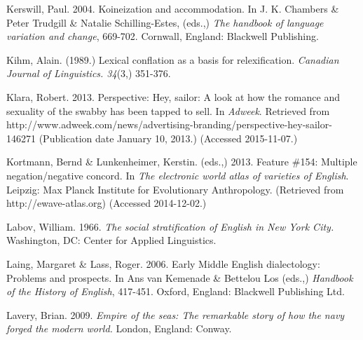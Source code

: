 \begin{styleStandard}
Kerswill, Paul. 2004. Koineization and accommodation. In J. K. Chambers \& Peter Trudgill \& Natalie Schilling-Estes, (eds.,) \textit{The handbook of language variation and change}, 669-702. Cornwall, England: Blackwell Publishing.
\end{styleStandard}


\begin{styleStandard}
Kihm, Alain. (1989.) Lexical conflation as a basis for relexification. \textit{Canadian Journal of Linguistics. 34}(3,) 351-376.
\end{styleStandard}


\begin{styleStandard}
Klara, Robert. 2013. Perspective: Hey, sailor: A look at how the romance and sexuality of the swabby has been tapped to sell. In \textit{Adweek}. Retrieved from http://www.adweek.com/news/advertising-branding/perspective-hey-sailor-146271 (Publication date January 10, 2013.) (Accessed 2015-11-07.)
\end{styleStandard}


\begin{styleStandard}
Kortmann, Bernd \& Lunkenheimer, Kerstin. (eds.,) 2013. Feature \#154: Multiple negation/negative concord. In \textit{The electronic world atlas of varieties of English}. Leipzig: Max Planck Institute for Evolutionary Anthropology. (Retrieved from http://ewave-atlas.org) (Accessed 2014-12-02.)
\end{styleStandard}


\begin{styleStandard}
Labov, William. 1966. \textit{The social stratification of English in New York City. }Washington, DC: Center for Applied Linguistics.
\end{styleStandard}


\begin{styleStandard}
Laing, Margaret \& Lass, Roger. 2006. Early Middle English dialectology: Problems and prospects. In Ans van Kemenade \& Bettelou Los (eds.,) \textit{Handbook of the History of English}, 417-451. Oxford, England: Blackwell Publishing Ltd.
\end{styleStandard}


\begin{styleStandard}
Lavery, Brian. 2009. \textit{Empire of the seas: The remarkable story of how the navy forged the modern world. }London, England: Conway. \ 
\end{styleStandard}


